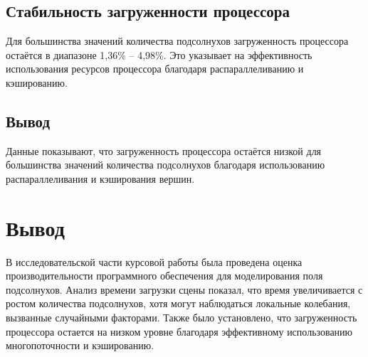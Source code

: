 \subsection{Стабильность загруженности процессора}
Для большинства значений количества подсолнухов загруженность процессора остаётся в диапазоне 1,36\% – 4,98\%. Это указывает на эффективность использования ресурсов процессора благодаря распараллеливанию и кэшированию.

\subsection{Вывод}
Данные показывают, что загруженность процессора остаётся низкой для большинства значений количества подсолнухов благодаря использованию распараллеливания и кэширования вершин.


\section{Вывод}
В исследовательской части курсовой работы была проведена оценка производительности программного обеспечения для моделирования поля подсолнухов. Анализ времени загрузки сцены показал, что время увеличивается с ростом количества подсолнухов, хотя могут наблюдаться локальные колебания, вызванные случайными факторами. Также было установлено, что загруженность процессора остается на низком уровне благодаря эффективному использованию многопоточности и кэшированию. 

